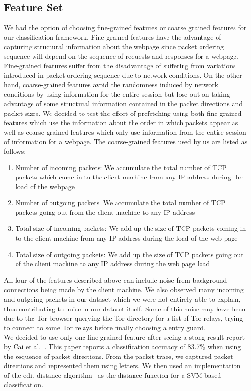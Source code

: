 \subsection{Feature Set}
We had the option of choosing fine-grained features or coarse grained features for our classification framework. 
Fine-grained features have the advantage of capturing structural information about the webpage since packet ordering sequence will depend on the sequence of requests and responses for a webpage. 
Fine-grained features suffer from the disadvantage of suffering from variations introduced in packet ordering sequence due to network conditions. 
On the other hand, coarse-grained features avoid the randomness induced by network conditions by using information for the entire session but lose out on taking advantage of some structural information contained in the packet directions and packet sizes.
We decided to test the effect of prefetching using both fine-grained features which use the information about the order in which packets appear as well as coarse-grained features which only use information from the entire session of information for a webpage. The coarse-grained features used by us are listed as follows:
\begin{enumerate}
\item 
Number of incoming packets: We accumulate the total number of TCP packets which came in to the client machine from any IP address during the load of the webpage
\item
Number of outgoing packets: We accumulate the total number of TCP packets going out from the client machine to any IP address
\item 
Total size of incoming packets: We add up the size of TCP packets coming in to the client machine from any IP address during the load of the web page
\item
Total size of outgoing packets: We add up the size of TCP packets going out of the client machine to any IP address during the web page load
\end{enumerate}
All four of the features described above can include noise from background connections being made by the client machine. 
We also observed many incoming and outgoing packets in our dataset which we were not entirely able to explain, thus contributing to noise in our dataset itself. 
Some of this noise may have been due to the Tor browser querying the Tor directory for a list of Tor relays, trying to connect to some Tor relays before finally choosing a entry guard.\\
We decided to use only one fine-grained feature after seeing a stong result report by Cai et al.~\cite{cai2012touching}. This paper reports a classification accuracy of 83.7\% when using the sequence of packet directions. From the packet trace, we captured packet directions and represented them using letters. We then used an implementation~\cite{edit-distance-matlab} of the edit distance algorithm~\cite{edit-distance} as the distance function for a SVM-based classification.



